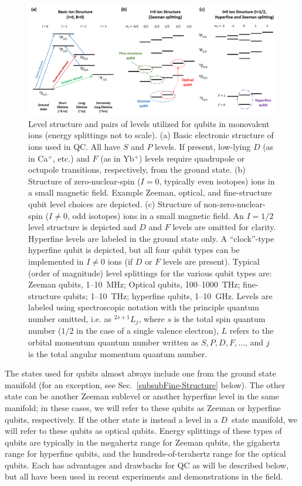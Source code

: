 \documentclass[%
reprint,
 amsmath,amssymb,
]{revtex4-1}
\begin{document}
\begin{figure}[t b h]
\includegraphics[width=2.0\columnwidth]{QubitsLevelStructure_2.png}
\caption{Level structure and pairs of levels utilized for qubits in monovalent ions (energy splittings not to scale).  (a) Basic electronic structure of ions used in QC.  All have $S$ and $P$ levels.  If present, low-lying $D$ (as in Ca$^{+}$, etc.) and $F$ (as in Yb$^{+}$) levels require quadrupole or octupole transitions, respectively, from the ground state.  (b) Structure of zero-nuclear-spin ($I=0$, typically even isotopes) ions in a small magnetic field.  Example Zeeman, optical, and fine-structure qubit level choices are depicted.  (c) Structure of non-zero-nuclear-spin ($I\neq0$, odd isotopes) ions in a small magnetic field.  An $I=1/2$ level structure is depicted and $D$ and $F$ levels are omitted for clarity.  Hyperfine levels are labeled in the ground state only.  A ``clock''-type hyperfine qubit is depicted, but all four qubit types can be implemented in $I\neq0$ ions (if $D$ or $F$ levels are present).  Typical (order of magnitude) level splittings for the various qubit types are:  Zeeman qubits, 1--10~MHz; Optical qubits, 100--1000~THz; fine-structure qubits; 1--10~THz; hyperfine qubits, 1--10~GHz.  Levels are labeled using spectroscopic notation with the principle quantum number omitted, i.e. as $^{2s+1}L_{j}$, where $s$ is the total spin quantum number ($1/2$ in the case of a single valence electron), $L$ refers to the orbital momentum quantum number written as $S, P, D, F, \ldots$, and $j$ is the total angular momentum quantum number.}
\label{fig:qubit_types}
\end{figure}

The states used for qubits almost always include one from the ground state manifold (for an exception, see Sec.~\ref{subsubFine-Structure} below).  The other state can be another Zeeman sublevel or another hyperfine level in the same manifold; in these cases, we will refer to these qubits as Zeeman or hyperfine qubits, respectively.  If the other state is instead a level in a $D$~state manifold, we will refer to these qubits as optical qubits.  Energy splittings of these types of qubits are typically in the megahertz range for Zeeman qubits, the gigahertz range for hyperfine qubits, and the hundreds-of-terahertz range for the optical qubits.  Each has advantages and drawbacks for QC as will be described below, but all have been used in recent experiments and demonstrations in the field.
\end{document}
